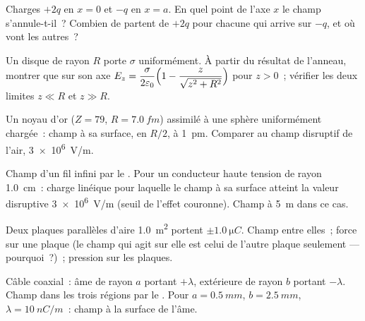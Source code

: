 \begin{exercise}[$\star$]\label{exo:b1:electrostatics-gauss:4}
Charges $+2q$ en $x = 0$ et $-q$ en $x = a$. En quel point de l'axe $x$ le
champ s'annule-t-il~? Combien de  partent de $+2q$ pour chacune
qui arrive sur $-q$, et où vont les autres~?
\end{exercise}

\begin{exercise}[$\star\star$]\label{exo:b1:electrostatics-gauss:5}
Un disque de rayon $R$ porte $\sigma$ uniformément. À partir du résultat de
l'anneau, montrer que sur son axe $E_z = \dfrac{\sigma}{2\varepsilon_0}\Bigl(1 - \dfrac{z}{\sqrt{z^2 +
R^2}}\Bigr)$ pour $z > 0$~; vérifier les deux limites $z \ll R$ et $z \gg R$.
\end{exercise}

\begin{exercise}[$\star\star$]\label{exo:b1:electrostatics-gauss:6}
Un noyau d'or ($Z = 79$, $R = \qty{7.0}{fm}$) assimilé à une sphère
uniformément chargée~: champ à sa surface, en $R/2$, à \qty{1}{pm}. Comparer
au champ disruptif de l'air, \qty{3e6}{V/m}.
\end{exercise}

\begin{exercise}[$\star\star$]\label{exo:b1:electrostatics-gauss:7}
Champ d'un fil infini par le . Pour un conducteur haute
tension de rayon \qty{1.0}{cm}~: charge linéique pour laquelle le champ à sa
surface atteint la valeur disruptive \qty{3e6}{V/m} (seuil de l'effet
couronne). Champ à \qty{5}{m} dans ce cas.
\end{exercise}

\begin{exercise}[$\star\star$]\label{exo:b1:electrostatics-gauss:8}
Deux plaques parallèles d'aire \qty{1.0}{m^2} portent $\pm\qty{1.0}{\micro C}$.
Champ entre elles~; force sur une plaque (le champ qui agit sur elle est celui
de l'autre plaque seulement --- pourquoi~?)~; pression sur les plaques.
\end{exercise}

\begin{exercise}[$\star\star$]\label{exo:b1:electrostatics-gauss:9}
Câble coaxial~: âme de rayon $a$ portant $+\lambda$,  extérieure de rayon
$b$ portant $-\lambda$. Champ dans les trois régions par le .
Pour $a = \qty{0.5}{mm}$, $b = \qty{2.5}{mm}$, $\lambda = \qty{10}{nC/m}$~:
champ à la surface de l'âme.
\end{exercise}

